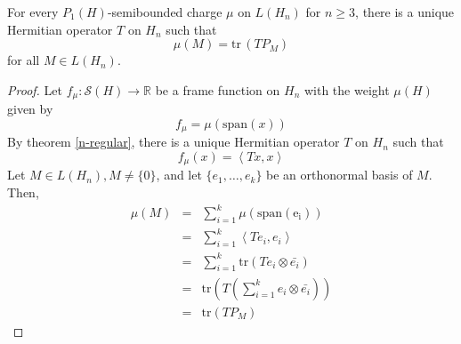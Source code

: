 \begin{theorem}
    For every \(P_1(H)\)-semibounded charge \(\mu\) on \(L(H_n)\) for \(n\ge 3\), there is a unique Hermitian operator \(T\) on \(H_n\) such that
    \[\mu(M)=\mathrm{tr}\,(TP_M)\]
    for all \(M \in L(H_n)\).
    \begin{proof}
        Let \(f_{\mu}: \mathcal{S}(H) \to \mathbb{R}\) be a frame function on \(H_n\) with the weight \(\mu(H)\) given by
        \[f_{\mu}=\mu(\mathrm{span}(x))\]
        By theorem \ref{n-regular}, there is a unique Hermitian operator \(T\) on \(H_n\) such that \[f_\mu(x)=\left \langle Tx,x \right \rangle\]
        Let \(M \in L(H_n), M \neq \{0\}\), and let \(\{e_1,\dots,e_k\}\) be an orthonormal basis of \(M\). Then,
        \begin{eqnarray*}
            \mu(M) &=& \sum_{i=1}^{k} \mu(\mathrm{span (e_i)}) \\
            &=& \sum_{i=1}^{k} \left \langle Te_i,e_i \right \rangle \\
            &=& \sum_{i=1}^{k} \mathrm{tr}(Te_i \otimes \bar{e_i}) \\
            &=& \mathrm{tr}\left(T\left( \sum_{i=1}^{k} e_i \otimes \bar{e_i} \right)\right)\\
            &=& \mathrm{tr}(TP_M)
        \end{eqnarray*}
    \end{proof}
\end{theorem}